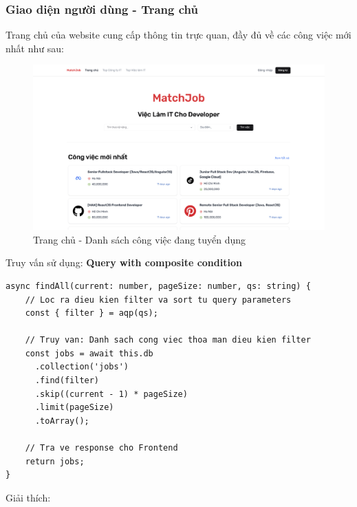 \subsubsection{Giao diện người dùng - Trang chủ}

Trang chủ của website cung cấp thông tin trực quan, đầy đủ về các công việc mới nhất như sau:

\begin{figure}[H]
    \centering
    \includegraphics[width=\linewidth]{DBMS-Application/Images/user-screen-job.png}
    \caption{Trang chủ - Danh sách công việc đang tuyển dụng}
    \label{fig:homepage-job}
\end{figure}

Truy vấn sử dụng: \textbf{Query with composite condition}
\begin{lstlisting}
async findAll(current: number, pageSize: number, qs: string) {
    // Loc ra dieu kien filter va sort tu query parameters
    const { filter } = aqp(qs);

    // Truy van: Danh sach cong viec thoa man dieu kien filter
    const jobs = await this.db
      .collection('jobs')
      .find(filter)
      .skip((current - 1) * pageSize)
      .limit(pageSize)
      .toArray();

    // Tra ve response cho Frontend
    return jobs;
}
\end{lstlisting}

Giải thích:

